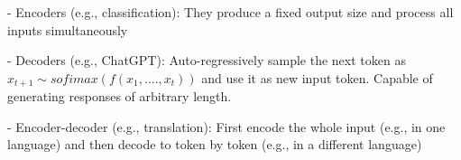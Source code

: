 - Encoders (e.g., classification): They produce a fixed output size and process all inputs simultaneously

- Decoders (e.g., ChatGPT): Auto-regressively sample the next token as $x_{t+1}\sim s o f i m a x(f(x_{1},....,x_{t}))$ and use it as new input token. Capable of generating responses of arbitrary length.

- Encoder-decoder (e.g., translation): First encode the whole input (e.g., in one language) and then decode to token by token (e.g., in a different language)
